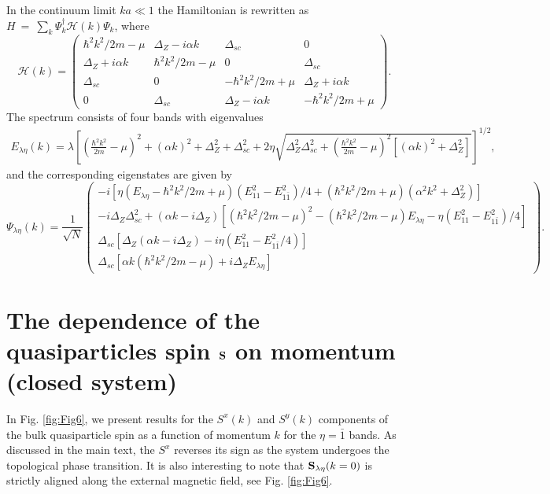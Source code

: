 \documentclass[prl,twocolumn,showpacs,floatfix,amsbsy,amsbsy,superscriptaddress]{revtex4-1}
\begin{document}
In the continuum limit $ka\ll 1$ the Hamiltonian is rewritten as $H~=~\sum_k\Psi_k^\dag\mathcal H(k)\Psi_k$, where
\begin{equation*}
\mathcal H(k)=
\left( \begin{array}{cccc}
\hbar^2k^2/2m-\mu & \Delta_Z-i\alpha k & \Delta_{sc} & 0\\
\Delta_Z+i\alpha k & \hbar^2k^2/2m-\mu & 0 & \Delta_{sc}\\
\Delta_{sc} & 0 & -\hbar^2k^2/2m+\mu & \Delta_Z+i\alpha k\\
0 & \Delta_{sc} & \Delta_Z-i\alpha k & -\hbar^2k^2/2m+\mu
\end{array}\right).
\end{equation*}
The spectrum consists of four bands with eigenvalues 
\begin{eqnarray}
    E_{\lambda\eta}(k)=\lambda \left [\left(\frac{\hbar^2 k^2}{2m}-\mu\right)^2+(\alpha k)^2+\Delta_Z^2+\Delta_{sc}^2+2\eta\sqrt{\Delta_Z^2\Delta_{sc}^2 + \left(\frac{\hbar^2 k^2}{2m} -\mu \right )^2[(\alpha k)^2+\Delta_Z^2]}\right ]^{1/2},
\end{eqnarray}
and the corresponding eigenstates are given by
\begin{equation}
\Psi_{\lambda\eta}(k)=
\frac{1}{\sqrt{N}}
\begin{pmatrix}
-i [ \eta (E_{\lambda\eta} -\hbar^2k^2/2m+\mu)(E_{11}^2 -E_{1\bar1}^2)/4  +(\hbar^2k^2/2m+\mu) (\alpha^2 k^2 +\Delta_Z^2) ]\\
-i \Delta_Z \Delta_{sc}^2 +(\alpha k - i \Delta_Z )[(\hbar^2 k^2/2m-\mu)^2 - (\hbar^2 k^2/2m-\mu) E_{\lambda \eta }-\eta (E_{11}^2 - E_{1\bar1}^2)/4] \\
\Delta_{sc} [\Delta_Z (\alpha k - i \Delta_Z )- i \eta (E_{11}^2 -E_{1\bar1}^2/4) ] \\
\Delta_{sc} [\alpha k (\hbar^2k^2/2m-\mu)+ i \Delta_Z E_{\lambda  \eta}]
\end{pmatrix}.
\end{equation}

\section{The dependence of the quasiparticles spin  $\bf S$ on momentum (closed system)}\label{Sx_Sy}

In Fig. \ref{fig:Fig6}, we present results for the $S^x(k)$ and $S^y(k)$ components of the bulk quasiparticle spin as a function of momentum $k$ for the $\eta=\bar 1$ bands. As discussed in the main text, the $S^x$ reverses its sign as the system undergoes the topological phase transition.
It is also interesting to note that ${\bf S}_{\lambda\eta}(k=0)$ is strictly aligned along the external magnetic field, see Fig. \ref{fig:Fig6}. 
\end{document}
